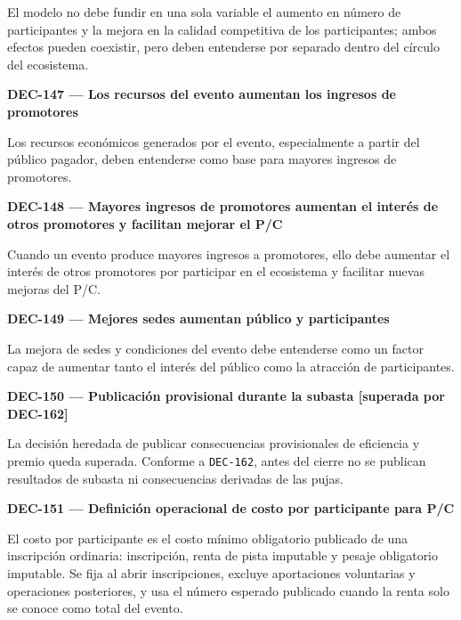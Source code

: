 \documentclass[10pt,letterpaper]{article}
\begin{document}
El modelo no debe fundir en una sola variable el aumento en número de participantes y la mejora en la calidad competitiva de los participantes; ambos efectos pueden coexistir, pero deben entenderse por separado dentro del círculo del ecosistema.\par\vspace{0.45em}
\noindent\textbf{DEC-147 --- Los recursos del evento aumentan los ingresos de promotores}\par
Los recursos económicos generados por el evento, especialmente a partir del público pagador, deben entenderse como base para mayores ingresos de promotores.\par\vspace{0.45em}
\noindent\textbf{DEC-148 --- Mayores ingresos de promotores aumentan el interés de otros promotores y facilitan mejorar el P/C}\par
Cuando un evento produce mayores ingresos a promotores, ello debe aumentar el interés de otros promotores por participar en el ecosistema y facilitar nuevas mejoras del P/C.\par\vspace{0.45em}
\noindent\textbf{DEC-149 --- Mejores sedes aumentan público y participantes}\par
La mejora de sedes y condiciones del evento debe entenderse como un factor capaz de aumentar tanto el interés del público como la atracción de participantes.\par\vspace{0.45em}
\noindent\textbf{DEC-150 --- Publicación provisional durante la subasta [superada por DEC-162]}\par
La decisión heredada de publicar consecuencias provisionales de eficiencia y premio queda superada. Conforme a \texttt{DEC-162}, antes del cierre no se publican resultados de subasta ni consecuencias derivadas de las pujas.\par\vspace{0.45em}
\noindent\textbf{DEC-151 --- Definición operacional de costo por participante para P/C}\par
El costo por participante es el costo mínimo obligatorio publicado de una inscripción ordinaria: inscripción, renta de pista imputable y pesaje obligatorio imputable. Se fija al abrir inscripciones, excluye aportaciones voluntarias y operaciones posteriores, y usa el número esperado publicado cuando la renta solo se conoce como total del evento.\par\vspace{0.45em}
\end{document}
